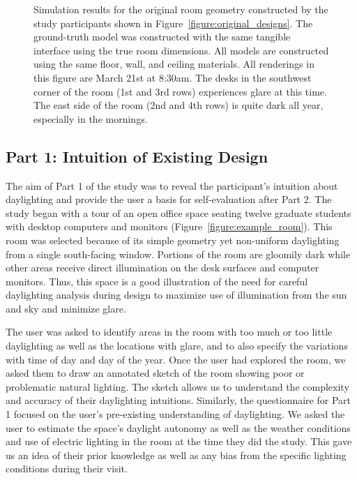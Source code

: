 \documentclass[review]{vgtc}                 %
\begin{document}
\begin{figure}[t]
\caption{ Simulation results for the original room geometry
  constructed by the study participants shown in
  Figure~\ref{figure:original_designs}.  The ground-truth model was
  constructed with the same tangible interface using the true room
  dimensions.  All models are constructed using the same floor, wall,
  and ceiling materials.  All renderings in this figure are March 21st
  at 8:30am.  The desks in the southwest corner of the room (1st and
  3rd rows) experiences glare at this time.  The east side of the room
  (2nd and 4th rows) is quite dark all year, especially in the
  mornings.  }
\vspace{-0.1in}
\label{figure:renderingsOfOriginalGeometry}
\end{figure}





\subsection{Part 1: Intuition of Existing Design}

The aim of Part 1 of the study was to reveal the participant's
intuition about daylighting and provide the user a basis for
self-evaluation after Part 2.  The study began with a tour of an open
office space seating twelve graduate students with desktop computers and
monitors (Figure~\ref{figure:example_room}).
%
This room was selected because of its simple geometry yet non-uniform
daylighting from a single south-facing window.
%
Portions of the room are gloomily dark while other areas
receive direct illumination on the desk surfaces and computer
monitors.  Thus, this space is a good illustration of the need for
careful daylighting analysis during design to maximize use of
illumination from the sun and sky and minimize glare.

The user was asked to identify areas in the room with too much or too
little daylighting as well as the locations with glare, and to also
specify the variations with time of day and day of the year.  Once the
user had explored the room, we asked them to draw an annotated sketch
of the room showing poor or problematic natural lighting.  The sketch
allows us to understand the complexity and accuracy of their
daylighting intuitions.  
%
Similarly, the questionnaire for Part 1 focused on the user's
pre-existing understanding of daylighting.  We asked the user to
estimate the space's daylight autonomy as well as the weather conditions and use of electric lighting
in the room at the time they did the study.  This gave us an idea of
their prior knowledge as well as any bias from the specific lighting
conditions during their visit.
\end{document}
